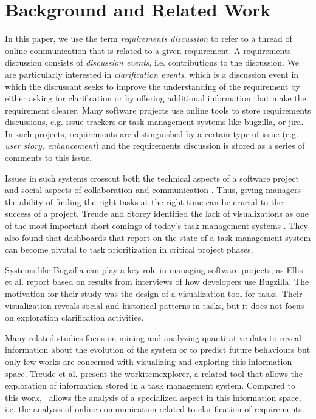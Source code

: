 \section{Background and Related Work}
In this paper, we use the term \emph{requirements discussion} to refer to a thread of online communication that is related to a given requirement. 
A requirements discussion consists of \emph{discussion events}, i.e. contributions to the discussion.
We are particularly interested in \emph{clarification events}, which is a discussion event in which the discussant seeks to improve the understanding of the requirement by either asking for clarification or by offering additional information that make the requirement clearer.
Many software projects use online tools to store requirements discussions, e.g. issue trackers or task management systems like bugzilla, or jira. 
In such projects, requirements are distinguished by a certain type of issue (e.g. \emph{user story, enhancement}) and the requirements discussion is stored as a series of comments to this issue.

Issues in such systems crosscut both the technical aspects of a software project and social aspects of collaboration and communication \cite{Kraut1995}. 
Thus, giving managers the ability of finding the right tasks at the right time can be crucial to the success of a project.
Treude and Storey identified the lack of visualizations as one of the most important short comings of today's task management systems \cite{Treude2010}. They also found that dashboards that report on the state of a task management system can become pivotal to task prioritization in critical project phases.

Systems like Bugzilla can play a key role in managing software projects, as Ellis et al. \cite{Ellis2007} report based on results from interviews of how developers use Bugzilla. 
The motivation for their study was the design of a visualization tool for tasks. 
Their visualization reveals social and historical patterns in tasks, but it does not focus on exploration clarification activities.

Many related studies focus on mining and analyzing quantitative data to reveal information about the evolution of the system or to predict future behaviours but only few works are concerned with visualizing and exploring this information space. 
Treude et al. \cite{Treude2012} present the workitemexplorer, a related tool that allows the exploration of information stored in a task management system.
Compared to this work, \viss\ allows the analysis of a specialized aspect in this information space, i.e. the analysis of online communication related to clarification of requirements. 